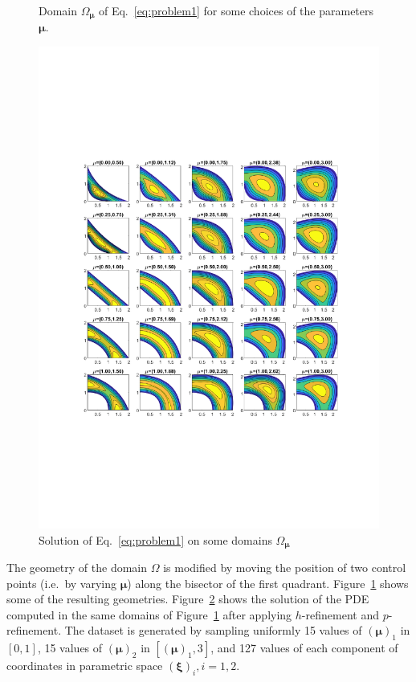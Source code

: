 \documentclass[11pt]{article}
\begin{document}
\begin{figure}[t]
\begin{minipage}{.59\textwidth}
    \caption{Domain $\Omega_{\boldsymbol \mu}$ of Eq.~\ref{eq:problem1} for some choices of the parameters $\boldsymbol \mu$.}
    \label{fig:quarer-ring-def}
\end{minipage}
\end{figure}

\begin{figure}[t]
    \centering
    \includegraphics[trim={2.7cm 6.5cm 2cm 7cm},clip,width=.7\textwidth]{imgs/quarter-ring-deform-solved.pdf}
    \caption{Solution of Eq.~\ref{eq:problem1} on some domains $\Omega_{\boldsymbol \mu}$}
    \label{fig:quarer-ring-def-sol}
\end{figure}


The geometry of the domain $\Omega$ is modified by moving the position of two control points (i.e.\ by varying $\boldsymbol \mu$) along the bisector of the first quadrant. Figure~\ref{fig:quarer-ring-def} shows some of the resulting geometries. Figure~\ref{fig:quarer-ring-def-sol} shows the solution of the PDE computed in the same domains of Figure~\ref{fig:quarer-ring-def} after applying $h$-refinement and $p$-refinement. The dataset is generated by sampling uniformly 15 values of $(\boldsymbol \mu)_1$ in $[0, 1]$, 15 values of $(\boldsymbol \mu)_2$ in $[(\boldsymbol \mu)_1, 3]$, and 127 values of each component of coordinates in parametric space $(\boldsymbol \xi)_i, i=1,2$. 
\end{document}
